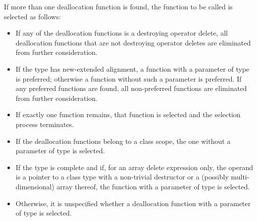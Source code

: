\pnum
If more than one deallocation function is found,
the function to be called is selected as follows:
\begin{itemize}
\item
If any of the deallocation functions is a destroying operator delete,
all deallocation functions that are not destroying operator deletes
are eliminated from further consideration.
\item
If the type has new-extended alignment,
a function with a parameter of type  is preferred;
otherwise a function without such a parameter is preferred.
If any preferred functions are found,
all non-preferred functions are eliminated from further consideration.
\item
If exactly one function remains,
that function is selected and the selection process terminates.
\item
If the deallocation functions belong to a class scope,
the one without a parameter of type  is selected.
\item
If the type is complete
and if, for an array delete expression only,
the operand is a pointer to a class type with a
non-trivial destructor or a (possibly multi-dimensional) array thereof,
the function with a parameter of type  is selected.
\item
Otherwise, it is unspecified
whether a deallocation function with a parameter of type 
is selected.
\end{itemize}

